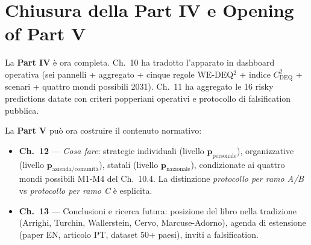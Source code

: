 \section{Chiusura della Part IV e Opening of Part
V}\label{chiusura-della-parte-iv-e-apertura-della-parte-v}

La \textbf{Part IV} è ora completa. Ch.~10 ha tradotto l'apparato in
dashboard operativa (sei pannelli + aggregato + cinque regole WE-DEQ$^2$ +
indice \(C_{\text{DEQ}}^2\) + scenari + quattro mondi possibili 2031).
Ch.~11 ha aggregato le 16 risky predictions datate con criteri
popperiani operativi e protocollo di falsification pubblica.

La \textbf{Part V} può ora costruire il contenuto normativo:

\begin{itemize}
\tightlist
\item
  \textbf{Ch.~12} --- \emph{Cosa fare}: strategie individuali (livello
  \(\boldsymbol{p}_{\text{personale}}\)), organizzative (livello
  \(\boldsymbol{p}_{\text{azienda/comunità}}\)), statali (livello
  \(\boldsymbol{p}_{\text{nazionale}}\)), condizionate ai quattro mondi
  possibili M1-M4 del Ch.~10.4. La distinzione \emph{protocollo per
  ramo A/B} vs \emph{protocollo per ramo C} è esplicita.
\item
  \textbf{Ch.~13} --- Conclusioni e ricerca futura: posizione del libro
  nella tradizione (Arrighi, Turchin, Wallerstein, Cervo,
  Marcuse-Adorno), agenda di estensione (paper EN, articolo PT, dataset
  50+ paesi), inviti a falsification.
\end{itemize}



